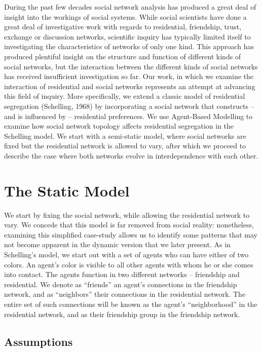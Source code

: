 \documentclass[a4paper,10pt]{article}
\title{}
\author{}
\begin{document}
During the past few decades social network analysis has produced a great deal of insight into the workings of social systems. While social scientists have done a great deal of investigative work with regards to residential, friendship, trust, exchange or discussion networks, scientific inquiry has typically limited itself to investigating the characteristics of networks of only one kind. This approach has produced plentiful insight on the structure and function of different kinds of social networks, but the interaction between the different kinds of social networks has received insufficient investigation so far. Our work, in which we examine the interaction of residential and social networks represents an attempt at advancing this field of inquiry. More specifically, we extend a classic model of residential segregation (Schelling, 1968) by incorporating a social network that constructs -- and is influenced by -- residential preferences. We use Agent-Based Modelling to examine how social network topology affects residential segregation in the Schelling model. We start with a semi-static model, where social networks are fixed but the residential network is allowed to vary, after which we proceed to describe the case where both networks evolve in interdependence with each other. 

\section{The Static Model}

We start by fixing the social network, while allowing the residential network to vary. We concede that this model is far removed from social reality: nonetheless, examining this simplified case-study allows us to identify some patterns that may not become apparent in the dynamic version that we later present. As in Schelling's model, we start out with a set of agents who can have either of two colors. An agent's color is visible to all other agents with whom he or she comes into contact. The agents function in two different networks -- friendship and residential. We denote as ``friends'' an agent's connections in the friendship network, and as ``neighbors'' their connections in the residential network. The entire set of such connections will be known as the agent's ``neighborhood'' in the residential network, and as their friendship group in the friendship network. 

\subsection{Assumptions}
\end{document}
